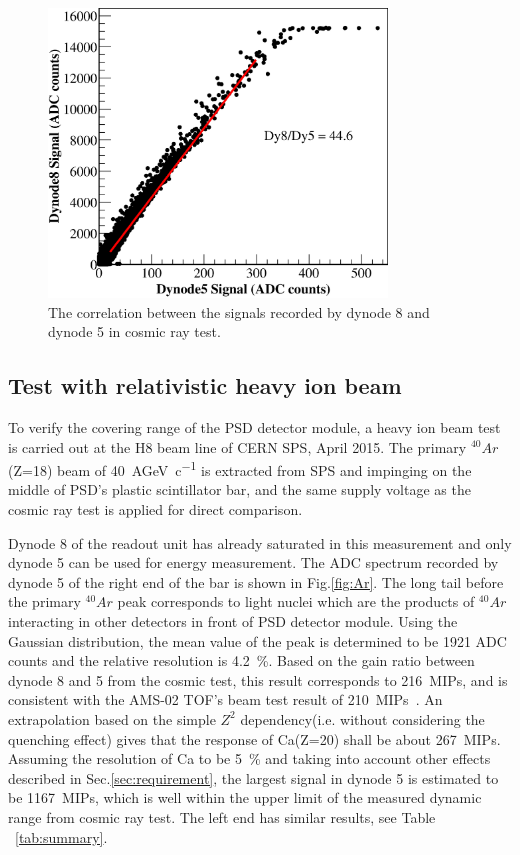 \documentclass[5p, times]{elsarticle}
\begin{document}
\begin{figure}
	\centering
	\includegraphics[width=90mm]{dy58}
	\caption{The correlation between the signals recorded by dynode 8 and dynode 5 in cosmic ray test.}
	\label{fig:dy58}
\end{figure} 

\subsection{Test with relativistic heavy ion beam}
\label{sec:beam}
To verify the covering range of the PSD detector module, a heavy ion beam test is carried out at the H8 beam line of CERN SPS, April 2015.
The primary $^{40}{Ar}$(Z=18) beam of \SI{40}{AGeV\per c} is extracted from SPS and impinging on the middle of PSD's plastic scintillator bar, and the same supply voltage as the cosmic ray test is applied for direct comparison.
  
Dynode 8 of the readout unit has already saturated in this measurement and only dynode 5 can be used for energy measurement.
The ADC spectrum recorded by dynode 5 of the right end of the bar is shown in Fig.\ref{fig:Ar}. 
The long tail before the primary $^{40}Ar$ peak corresponds to light nuclei which are the products of $^{40}Ar$ interacting in other detectors in front of PSD detector module.
Using the Gaussian distribution, the mean value of the peak is determined to be 1921 ADC counts and the relative resolution is \SI{4.2}{\percent}.
Based on the gain ratio between dynode 8 and 5 from the cosmic test, this result corresponds to \SI{216}{MIPs}, and is consistent with the AMS-02 TOF's beam test result of \SI{210}{MIPs}~\cite{bindi2005performance}.
An extrapolation based on the simple $Z^2$ dependency(i.e. without considering the quenching effect) gives that the response of Ca(Z=20) shall be about \SI{267}{MIPs}.
Assuming the resolution of Ca to be \SI{5}{\percent} and taking into account other effects described in Sec.\ref{sec:requirement}, the largest signal in dynode 5 is estimated to be \SI{1167}{MIPs}, which is well within the upper limit of the measured dynamic range from cosmic ray test.
The left end has similar results, see Table ~\ref{tab:summary}.
\end{document}

